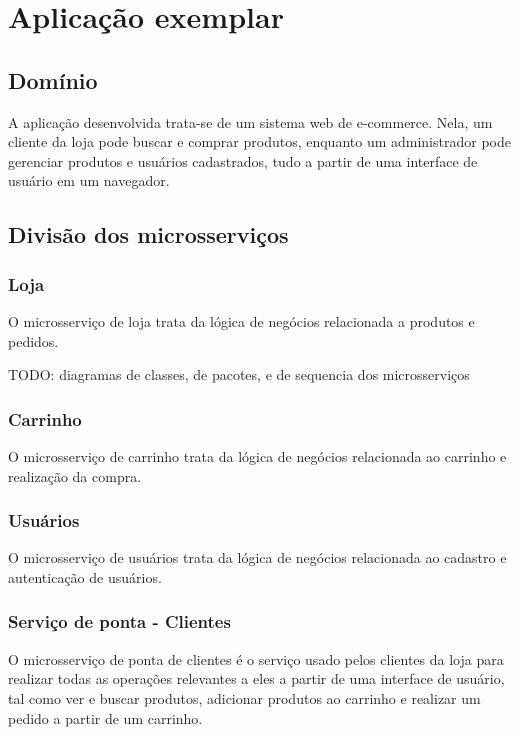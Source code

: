 \chapter{Aplicação exemplar}\label{chapter-aplicacao}


\section{Domínio}
A aplicação desenvolvida trata-se de um sistema web de e-commerce. Nela, um cliente da loja pode buscar e comprar produtos, enquanto um administrador pode gerenciar produtos e usuários cadastrados, tudo a partir de uma interface de usuário em um navegador.

\section{Divisão dos microsserviços}

\subsection*{Loja}
O microsserviço de loja trata da lógica de negócios relacionada a produtos e pedidos.

TODO: diagramas de classes, de pacotes, e de sequencia dos microsserviços

\subsection*{Carrinho}
O microsserviço de carrinho trata da lógica de negócios relacionada ao carrinho e realização da compra.

\subsection*{Usuários}
O microsserviço de usuários trata da lógica de negócios relacionada ao cadastro e autenticação de usuários.

\subsection*{Serviço de ponta - Clientes}
O microsserviço de ponta de clientes é o serviço usado pelos clientes da loja para realizar todas as operações relevantes a eles a partir de uma interface de usuário, tal como ver e buscar produtos, adicionar produtos ao carrinho e realizar um pedido a partir de um carrinho.

